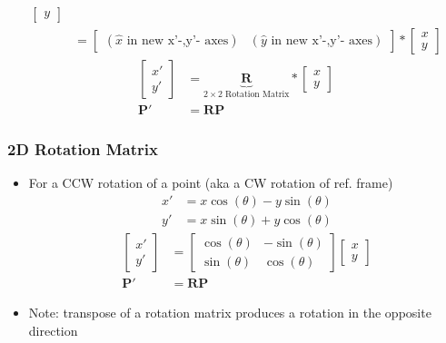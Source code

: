 \documentclass[letterpaper,12pt]{article}
\newcommand{\vect}[1]{\mathbf{#1}}
\newcommand{\matr}[1]{\mathbf{#1}}
\begin{document}
\begin{itemize}
\begin{align}
\begin{bmatrix}
         y
        \end{bmatrix}    \\
         & =\begin{bmatrix}
         (\hat{x} \text{ in new x'-,y'- axes}) &
         (\hat{y} \text{ in new x'-,y'- axes})
        \end{bmatrix}
        *\begin{bmatrix}
         x \\
         y
        \end{bmatrix}
       \end{align}
       \begin{align}
        \begin{bmatrix}
         x' \\
         y'
        \end{bmatrix}
                  & = \underbrace{\matr{R}}_\text{$2\times2$ Rotation Matrix}
        *\begin{bmatrix}
         x \\
         y
        \end{bmatrix}                                           \\
        \vect{P}' & = \matr{R}\vect{P}
       \end{align}
\end{itemize}

\subsubsection{2D Rotation Matrix}

\begin{itemize}
 \item For a CCW rotation of a point (aka a CW rotation of ref. frame)
       \begin{align}
        x' & = x\cos(\theta) - y\sin(\theta) \\
        y' & = x\sin(\theta) + y\cos(\theta)
       \end{align}
       \begin{align}
        \begin{bmatrix}
         x' \\
         y'
        \end{bmatrix}
                  & = \begin{bmatrix}
         \cos(\theta) & -\sin(\theta) \\
         \sin(\theta) & \cos(\theta)
        \end{bmatrix}
        \begin{bmatrix}
         x \\
         y
        \end{bmatrix}               \\
        \vect{P}' & = \matr{R}\vect{P}
       \end{align}
 \item Note: transpose of a rotation matrix produces a rotation in the opposite direction
\end{itemize}
\end{document}
